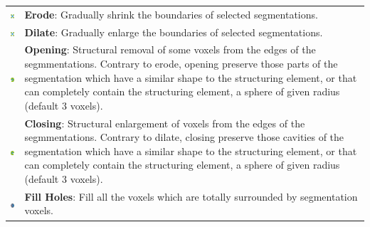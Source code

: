 \begin{tabular}{m{0.8cm} m{13cm}}
\includegraphics[width=0.7cm]{../../frontend/rsc/erode} &
\textbf{Erode}: Gradually shrink the boundaries of selected segmentations.\\
\includegraphics[width=0.7cm]{../../frontend/rsc/dilate} &
\textbf{Dilate}: Gradually enlarge the boundaries of selected segmentations. \\
\includegraphics[width=0.7cm]{../../frontend/rsc/open} &
\textbf{Opening}: Structural removal of some voxels from the edges of the segmmentations. Contrary to erode, opening preserve those parts of the segmentation which have a similar shape to the structuring element, or that can completely contain the structuring element, a sphere of given radius (default 3 voxels).\\
\includegraphics[width=0.7cm]{../../frontend/rsc/close} &
\textbf{Closing}: Structural enlargement of voxels from the edges of the segmmentations. Contrary to dilate, closing preserve those cavities of the segmentation which have a similar shape to the structuring element, or that can completely contain the structuring element, a sphere of given radius (default 3 voxels).\\
\includegraphics[width=0.7cm]{../../frontend/rsc/fillHoles} &
\textbf{Fill Holes}: Fill all the voxels which are totally surrounded by
segmentation voxels.
\end{tabular}
